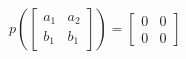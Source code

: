 \documentclass[preview]{standalone}
\begin{document}
\begin{center}
$p\left(\begin{bmatrix} a_1 & a_2 \\ b_1 & b_1 \end{bmatrix}\right) = \begin{bmatrix} 0 & 0 \\ 0 & 0 \end{bmatrix}$
\end{center}
\end{document}
